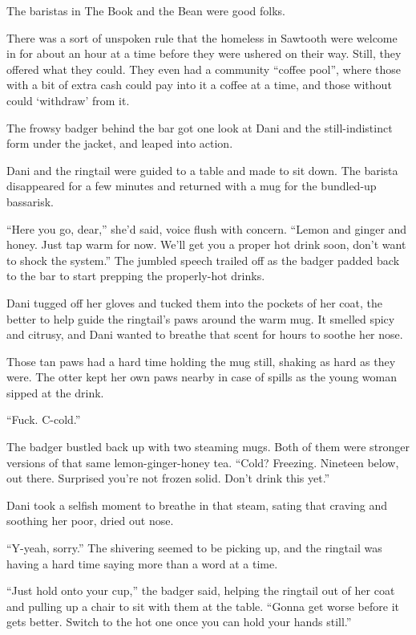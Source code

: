 The baristas in The Book and the Bean were good folks.

There was a sort of unspoken rule that the homeless in Sawtooth were welcome in for about an hour at a time before they were ushered on their way. Still, they offered what they could. They even had a community ``coffee pool'', where those with a bit of extra cash could pay into it a coffee at a time, and those without could `withdraw' from it.

The frowsy badger behind the bar got one look at Dani and the still-indistinct form under the jacket, and leaped into action.

Dani and the ringtail were guided to a table and made to sit down. The barista disappeared for a few minutes and returned with a mug for the bundled-up bassarisk.

``Here you go, dear,'' she'd said, voice flush with concern. ``Lemon and ginger and honey. Just tap warm for now. We'll get you a proper hot drink soon, don't want to shock the system.'' The jumbled speech trailed off as the badger padded back to the bar to start prepping the properly-hot drinks.

Dani tugged off her gloves and tucked them into the pockets of her coat, the better to help guide the ringtail's paws around the warm mug. It smelled spicy and citrusy, and Dani wanted to breathe that scent for hours to soothe her nose.

Those tan paws had a hard time holding the mug still, shaking as hard as they were. The otter kept her own paws nearby in case of spills as the young woman sipped at the drink.

``Fuck. C-cold.''

The badger bustled back up with two steaming mugs. Both of them were stronger versions of that same lemon-ginger-honey tea. ``Cold? Freezing. Nineteen below, out there. Surprised you're not frozen solid. Don't drink this yet.''

Dani took a selfish moment to breathe in that steam, sating that craving and soothing her poor, dried out nose.

``Y-yeah, sorry.'' The shivering seemed to be picking up, and the ringtail was having a hard time saying more than a word at a time.

``Just hold onto your cup,'' the badger said, helping the ringtail out of her coat and pulling up a chair to sit with them at the table. ``Gonna get worse before it gets better. Switch to the hot one once you can hold your hands still.''

